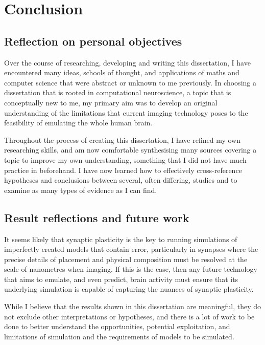\chapter{Conclusion}

\section{Reflection on personal objectives}

Over the course of researching, developing and writing this dissertation, I have
encountered many ideas, schools of thought, and applications of maths and
computer science that were abstract or unknown to me previously. In choosing a
dissertation that is rooted in computational neuroscience, a topic that is
conceptually new to me, my primary aim was to develop an original understanding
of the limitations that current imaging technology poses to the feasibility of
emulating the whole human brain. 

Throughout the process of creating this dissertation, I have refined my own
researching skills, and am now comfortable synthesising many sources covering a
topic to improve my own understanding, something that I did not have much
practice in beforehand. I have now learned how to effectively cross-reference
hypotheses and conclusions between several, often differing, studies and to
examine as many types of evidence as I can find.



\section{Result reflections and future work}

It seems likely that synaptic plasticity is the key to running simulations of
imperfectly created models that contain error, particularly in synapses where
the precise details of placement and physical composition must be resolved at
the scale of nanometres when imaging. If this is the case, then any future
technology that aims to emulate, and even predict, brain activity must ensure
that its underlying simulation is capable of capturing the nuances of synaptic
plasticity. 

While I believe that the results shown in this dissertation are meaningful, they
do not exclude other interpretations or hypotheses, and there is a lot of work
to be done to better understand the opportunities, potential exploitation, and
limitations of simulation and the requirements of models to be simulated.

